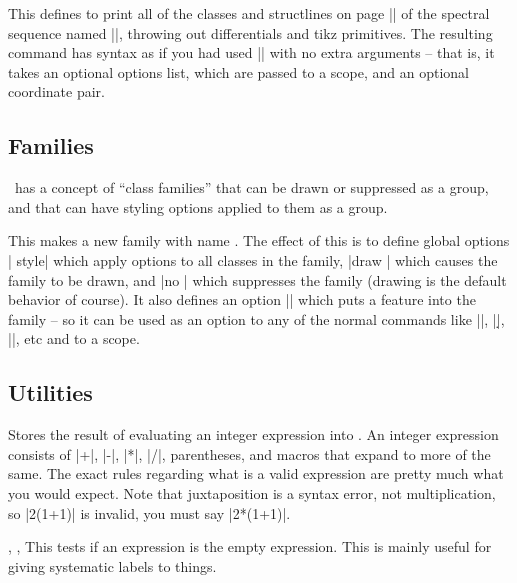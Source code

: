\begin{sseqdata}[name = basic, cohomological Serre grading]
\begin{command}{\SseqCopyPage{}}%
This defines  to print all of the classes and structlines on
page || of the spectral sequence named%
||, throwing out differentials and tikz primitives.
The resulting command has syntax as if you had used |\DeclareSseqGroup| with no
extra arguments -- that is, it takes an optional options list, which are passed
to a scope, and an optional coordinate pair.
\end{command}

\subsection{Families}
\spectralsequences\ has a concept of ``class families'' that can be drawn or
suppressed as a group, and that can have styling options applied to them as a
group.
\begin{command}{\SseqNewFamily{}}%
This makes a new family with name . The effect of this is to
define global options | style| which apply options to all
classes in the family, |draw | which causes the family to be
drawn, and |no | which suppresses the family (drawing is the
default behavior of course). It also defines an option ||
which puts a feature into the family -- so it can be used as an option to any of
the normal commands like |\class|, |\d|, |\structline|, etc and to a scope.

\codeexample[vbox, from file=imJ]
\end{command}


\subsection{Utilities}
\begin{command}{\SseqParseInt{}}%
Stores the result of evaluating an integer expression into . An
integer expression consists of |+|, |-|, |*|, |/|, parentheses, and macros that
expand to more of the same. The exact rules regarding what is a valid expression
are pretty much what you would expect. Note that juxtaposition is a syntax
error, not multiplication, so |2(1+1)| is invalid, you must say |2*(1+1)|.
\end{command}

\begin{commandlist}{
    \SseqIfEmptyTF{},
    \SseqIfEmptyT{},
    \SseqIfEmptyF{}
}%
This tests if an expression is the empty expression. This is mainly useful for
giving systematic labels to things.
\end{commandlist}


\end{sseqdata}
